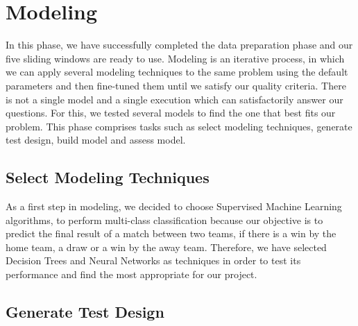 \chapter{Modeling}
\label{cha:Modelling}

In this phase, we have successfully completed the data preparation phase and our five sliding windows are ready to use. \newline \newline
Modeling is an iterative process, in which we can apply several modeling techniques to the same problem using the default parameters and then fine-tuned them until we satisfy our quality criteria. There is not a single model and a single execution which can satisfactorily answer our questions. For this, we tested several models to find the one that best fits our problem.\newline \newline
This phase comprises tasks such as select modeling techniques, generate test design, build model and assess model.


\section{Select Modeling Techniques}

As a first step in modeling, we decided to choose Supervised Machine Learning algorithms, to perform multi-class classification because our objective is to predict the final result of a match between two teams, if there is a win by the home team, a draw or a win by the away team. \newline \newline
Therefore, we have selected Decision Trees and Neural Networks as techniques in order to test its performance and find the most appropriate for our project.

\section{Generate Test Design}

